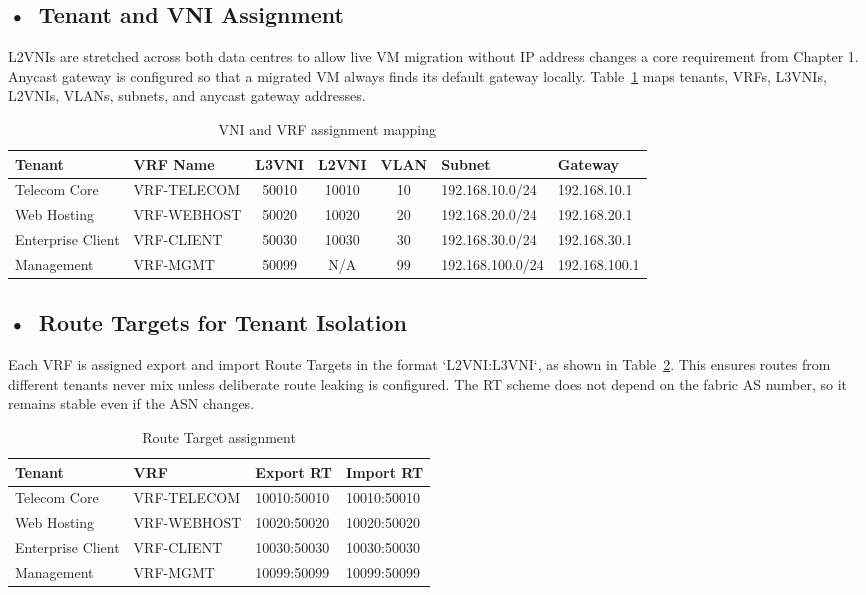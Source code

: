 \subsection*{\mbox{•}~Tenant and VNI Assignment}
L2VNIs are stretched across both data centres to allow live VM migration without IP address changes  a core requirement from Chapter 1. Anycast gateway is configured so that a migrated VM always finds its default gateway locally. Table~\ref{tab:vni-vrf-assignment} maps tenants, VRFs, L3VNIs, L2VNIs, VLANs, subnets, and anycast gateway addresses.

\begin{table}[!htbp]
\centering
\small
\begin{tabularx}{\textwidth}{@{}l l c c c l l@{}}
\toprule
\textbf{Tenant} & \textbf{VRF Name} & \textbf{L3VNI} & \textbf{L2VNI} & \textbf{VLAN} & \textbf{Subnet} & \textbf{Gateway} \\ \midrule
Telecom Core & VRF-TELECOM & 50010 & 10010 & 10 & 192.168.10.0/24 & 192.168.10.1 \\
Web Hosting & VRF-WEBHOST & 50020 & 10020 & 20 & 192.168.20.0/24 & 192.168.20.1 \\
Enterprise Client & VRF-CLIENT & 50030 & 10030 & 30 & 192.168.30.0/24 & 192.168.30.1 \\
Management & VRF-MGMT & 50099 & N/A & 99 & 192.168.100.0/24 & 192.168.100.1 \\ \bottomrule
\end{tabularx}
\caption{VNI and VRF assignment mapping}
\label{tab:vni-vrf-assignment}
\end{table}

\subsection*{\mbox{•}~Route Targets for Tenant Isolation}
Each VRF is assigned export and import Route Targets in the format `L2VNI:L3VNI`, as shown in Table~\ref{tab:rt-mapping}. This ensures routes from different tenants never mix unless deliberate route leaking is configured. The RT scheme does not depend on the fabric AS number, so it remains stable even if the ASN changes.

\begin{table}[!htbp]
\centering
\small
\setlength{\tabcolsep}{2em}
\renewcommand{\arraystretch}{1.3}
\begin{tabular}{@{}l l l l@{}}
\toprule
\textbf{Tenant} & \textbf{VRF} & \textbf{Export RT} & \textbf{Import RT} \\ \midrule
Telecom Core & VRF-TELECOM & 10010:50010 & 10010:50010 \\
Web Hosting & VRF-WEBHOST & 10020:50020 & 10020:50020 \\
Enterprise Client & VRF-CLIENT & 10030:50030 & 10030:50030 \\
Management & VRF-MGMT & 10099:50099 & 10099:50099 \\ \bottomrule
\end{tabular}
\caption{Route Target assignment}
\label{tab:rt-mapping}
\end{table}

